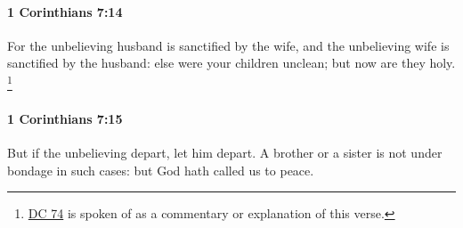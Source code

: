 		\paragraph{1 Corinthians 7:14} %
			\label{1CORINTHIANS-7-14}

			For the unbelieving husband is sanctified by the wife, and the unbelieving wife is sanctified by the husband: else were your children unclean; but now are they holy.%
				\footnote{%
					\hyperref[DC74]{DC 74} is spoken of as a commentary or explanation of this verse.
					}

			\begin{framed}
			\scriptsize
				\begin{compactdesc}
					\item[SBLG] 
				\end{compactdesc}
			\end{framed}

		\paragraph{1 Corinthians 7:15} %
			\label{1CORINTHIANS-7-15}

			But if the unbelieving depart, let him depart.  A brother or a sister is not under bondage in such cases: but God hath called us to peace.

